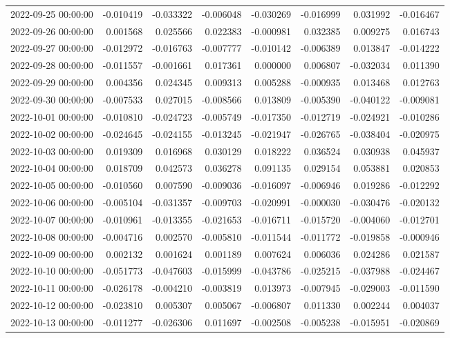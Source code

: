 \begin{tabular}{lrrrrrrr}
2022-09-25 00:00:00 & -0.010419 & -0.033322 & -0.006048 & -0.030269 & -0.016999 & 0.031992 & -0.016467 \\
2022-09-26 00:00:00 & 0.001568 & 0.025566 & 0.022383 & -0.000981 & 0.032385 & 0.009275 & 0.016743 \\
2022-09-27 00:00:00 & -0.012972 & -0.016763 & -0.007777 & -0.010142 & -0.006389 & 0.013847 & -0.014222 \\
2022-09-28 00:00:00 & -0.011557 & -0.001661 & 0.017361 & 0.000000 & 0.006807 & -0.032034 & 0.011390 \\
2022-09-29 00:00:00 & 0.004356 & 0.024345 & 0.009313 & 0.005288 & -0.000935 & 0.013468 & 0.012763 \\
2022-09-30 00:00:00 & -0.007533 & 0.027015 & -0.008566 & 0.013809 & -0.005390 & -0.040122 & -0.009081 \\
2022-10-01 00:00:00 & -0.010810 & -0.024723 & -0.005749 & -0.017350 & -0.012719 & -0.024921 & -0.010286 \\
2022-10-02 00:00:00 & -0.024645 & -0.024155 & -0.013245 & -0.021947 & -0.026765 & -0.038404 & -0.020975 \\
2022-10-03 00:00:00 & 0.019309 & 0.016968 & 0.030129 & 0.018222 & 0.036524 & 0.030938 & 0.045937 \\
2022-10-04 00:00:00 & 0.018709 & 0.042573 & 0.036278 & 0.091135 & 0.029154 & 0.053881 & 0.020853 \\
2022-10-05 00:00:00 & -0.010560 & 0.007590 & -0.009036 & -0.016097 & -0.006946 & 0.019286 & -0.012292 \\
2022-10-06 00:00:00 & -0.005104 & -0.031357 & -0.009703 & -0.020991 & -0.000030 & -0.030476 & -0.020132 \\
2022-10-07 00:00:00 & -0.010961 & -0.013355 & -0.021653 & -0.016711 & -0.015720 & -0.004060 & -0.012701 \\
2022-10-08 00:00:00 & -0.004716 & 0.002570 & -0.005810 & -0.011544 & -0.011772 & -0.019858 & -0.000946 \\
2022-10-09 00:00:00 & 0.002132 & 0.001624 & 0.001189 & 0.007624 & 0.006036 & 0.024286 & 0.021587 \\
2022-10-10 00:00:00 & -0.051773 & -0.047603 & -0.015999 & -0.043786 & -0.025215 & -0.037988 & -0.024467 \\
2022-10-11 00:00:00 & -0.026178 & -0.004210 & -0.003819 & 0.013973 & -0.007945 & -0.029003 & -0.011590 \\
2022-10-12 00:00:00 & -0.023810 & 0.005307 & 0.005067 & -0.006807 & 0.011330 & 0.002244 & 0.004037 \\
2022-10-13 00:00:00 & -0.011277 & -0.026306 & 0.011697 & -0.002508 & -0.005238 & -0.015951 & -0.020869 \\

\end{tabular}

